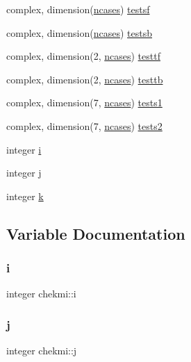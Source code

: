 \begin{DoxyCompactItemize}
\item 
complex, dimension(\hyperlink{namespacechekmi_a7a072a81d4a96e7c6d537baf67910952}{ncases}) \hyperlink{namespacechekmi_a8ec68fd14c1154b5c3bbd7433943536c}{testsf}
\item 
complex, dimension(\hyperlink{namespacechekmi_a7a072a81d4a96e7c6d537baf67910952}{ncases}) \hyperlink{namespacechekmi_abfd5fc456a9491beedef5d90b582317c}{testsb}
\item 
complex, dimension(2, \hyperlink{namespacechekmi_a7a072a81d4a96e7c6d537baf67910952}{ncases}) \hyperlink{namespacechekmi_a843b213251154034283b51b4c315cfdd}{testtf}
\item 
complex, dimension(2, \hyperlink{namespacechekmi_a7a072a81d4a96e7c6d537baf67910952}{ncases}) \hyperlink{namespacechekmi_a47fa67597e3879f8b3b9c044b05a6dc8}{testtb}
\item 
complex, dimension(7, \hyperlink{namespacechekmi_a7a072a81d4a96e7c6d537baf67910952}{ncases}) \hyperlink{namespacechekmi_a72feac83354e1d6b12318bc4c4c78105}{tests1}
\item 
complex, dimension(7, \hyperlink{namespacechekmi_a7a072a81d4a96e7c6d537baf67910952}{ncases}) \hyperlink{namespacechekmi_ae467738ccccb2e776eab2a353e503a82}{tests2}
\item 
integer \hyperlink{namespacechekmi_a2d4be9902cce35087e7b61f8922f6687}{i}
\item 
integer \hyperlink{namespacechekmi_afaaa1650adb97ff2f8c9c36515034172}{j}
\item 
integer \hyperlink{namespacechekmi_acf2af53a886da17ecabc9ed0da7c06a3}{k}
\end{DoxyCompactItemize}


\subsection{Variable Documentation}
\mbox{\label{namespacechekmi_a2d4be9902cce35087e7b61f8922f6687}} 
\subsubsection{\texorpdfstring{i}{i}}
{\footnotesize\ttfamily integer chekmi\+::i}

\mbox{\label{namespacechekmi_afaaa1650adb97ff2f8c9c36515034172}} 
\subsubsection{\texorpdfstring{j}{j}}
{\footnotesize\ttfamily integer chekmi\+::j}

